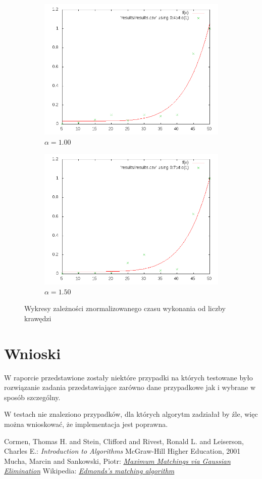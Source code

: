 \documentclass{llncs}
\begin{document}
\begin{figure}
%
\begin{subfigure}
  \centering
  \includegraphics[width=.4\linewidth]{img/100.png}
  \caption{$\alpha=1.00$}
  \label{fig:sub2}
\end{subfigure}
%
\begin{subfigure}
  \centering
  \includegraphics[width=.4\linewidth]{img/150.png}
  \caption{$\alpha=1.50$}
  \label{fig:sub2}
\end{subfigure}
\caption{Wykresy zależności znormalizowanego czasu wykonania od liczby krawędzi}
\label{fig:complexity}
\end{figure}

\section{Wnioski}
W raporcie przedstawione zostały niektóre przypadki na których testowane było rozwiązanie zadania przedstawiające zarówno dane przypadkowe jak i wybrane w sposób szczególny.

W testach nie znaleziono przypadków, dla których algorytm zadziałał by źle, więc można wnioskować, że implementacja jest poprawna.

%
\begin{thebibliography}{4}
%
Cormen, Thomas H. and Stein, Clifford and Rivest, Ronald L. and Leiserson, Charles E.:
\textsl{Introduction to Algorithms}
McGraw-Hill Higher Education, 2001
Mucha, Marcin and Sankowski, Piotr:
\textsl{\href{http://www.mimuw.edu.pl/~mucha/pub/mucha_sankowski_focs04.pdf}{Maximum Matchings via Gaussian Elimination}}
Wikipedia:
\textsl{\href{http://en.wikipedia.org/wiki/Blossom_algorithm}{Edmonds's matching algorithm}}
\end{thebibliography}
\end{document}
